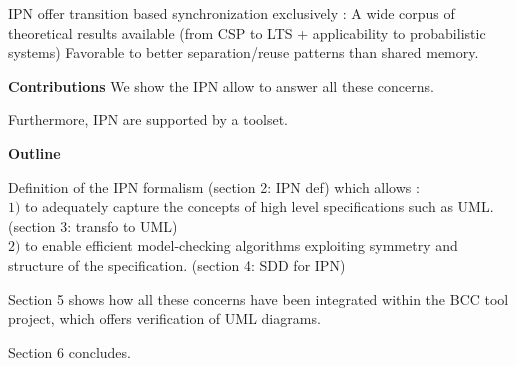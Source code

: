 IPN offer transition based synchronization exclusively :
A wide corpus of theoretical results available (from CSP to LTS + applicability to probabilistic systems)
Favorable to better separation/reuse patterns than shared memory.

\textbf{Contributions}
We show the IPN allow to answer all these concerns.

Furthermore, IPN are supported by a toolset.

\textbf{Outline}

Definition of the IPN formalism (section 2: IPN def) which allows :\\
$1)$ to adequately capture the concepts of high level specifications such as UML. (section 3: transfo to UML)\\
$2)$ to enable efficient model-checking algorithms exploiting symmetry and structure of the specification. (section 4: SDD for IPN)

Section 5 shows how all these concerns have been integrated within the BCC tool project, which offers verification of UML diagrams.

Section 6 concludes. 